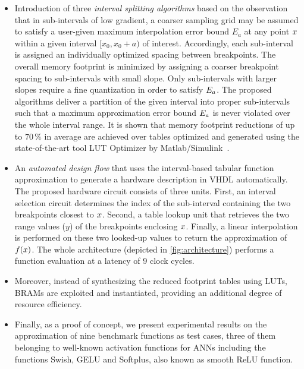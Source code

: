 \begin{itemize}
\item Introduction of three \textit{interval splitting algorithms} based on the observation that in sub-intervals of low gradient, a coarser sampling grid may be assumed to satisfy a user-given maximum interpolation error bound $E_a$ at any point $x$ within a given interval $[x_0, x_0 +a)$ of interest.
Accordingly, each sub-interval is assigned an individually optimized spacing between breakpoints. 
The overall memory footprint is minimized by assigning a coarser breakpoint spacing to sub-intervals with small slope. 
Only sub-intervals with larger slopes require a fine quantization in order to satisfy $E_a$.
The proposed algorithms deliver a partition of the given interval into proper sub-intervals such that a maximum approximation error bound $E_a$ is never violated over the whole interval range. 
It is shown that memory footprint reductions of up to $70\,\%$ in average are achieved over tables optimized and generated using the state-of-the-art tool LUT Optimizer by Matlab/Simulink~\cite{MATLAB:2019}.
\item An \textit{automated design flow} that uses the interval-based tabular function approximation to generate a hardware description in VHDL automatically. 
The proposed hardware circuit consists of three units. 
First, an interval selection circuit determines the index of the sub-interval containing the two breakpoints closest to $x$.
Second, a table lookup unit that retrieves the two range values ($y$) of the breakpoints enclosing $x$. %
Finally, a linear interpolation is performed on these two looked-up values to return the approximation of $f(x)$. 
The whole architecture (depicted in \cref{fig:architecture}) performs a function evaluation at a latency of 9 clock cycles.
\item Moreover, instead of synthesizing the reduced footprint tables using LUTs, \acp{BRAM} are exploited and instantiated, providing an additional degree of resource efficiency. 
\item Finally, as a proof of concept, we present experimental results on the approximation of nine benchmark functions as test cases, three of them belonging to well-known activation functions for \acp{ANN} including the functions \ac{Swish}, \ac{GELU} and Softplus, also known as smooth \ac{ReLU} function.

\end{itemize}
